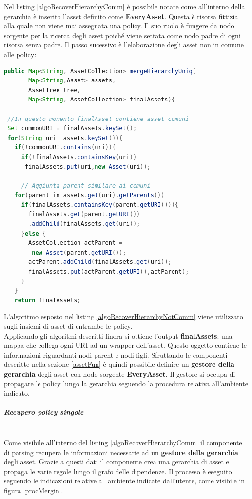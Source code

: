 \documentclass[12pt,a4paper,twoside]{book}
\begin{document}
Nel listing \ref{algoRecoverHierarchyComm} è possibile notare come all'interno della gerarchia è inserito l'asset definito come \textbf{EveryAsset}. Questa è risorsa fittizia alla quale non viene mai assegnata una policy. Il suo ruolo è fungere da nodo sorgente per la ricerca degli asset poiché viene settata come nodo padre di ogni risorsa senza padre.\newpage
Il passo sucessivo è l'elaborazione degli asset non in comune alle policy:\\
\begin{lstlisting}[language=java,firstnumber=1,caption={L'algoritmo ha prestazioni lineari in proporzione al numero di asset},label=algoRecoverHierarchyNotComm,captionpos=b]
public Map<String, AssetCollection> mergeHierarchyUniq(
       Map<String,Asset> assets,
       AssetTree tree,
       Map<String, AssetCollection> finalAssets){
       
 //In questo momento finalAsset contiene asset comuni      
 Set commonURI = finalAssets.keySet();  
 for(String uri: assets.keySet()){
   if(!commonURI.contains(uri)){
     if(!finalAssets.containsKey(uri))
      finalAssets.put(uri,new Asset(uri));
      
	 // Aggiunta parent similare ai comuni
   for(parent in assets.get(uri).getParents())
     if(finalAssets.containsKey(parent.getURI())){
       finalAssets.get(parent.getURI())
       .addChild(finalAssets.get(uri));
     }else {
       AssetCollection actParent =
        new Asset(parent.getURI());
       actParent.addChild(finalAssets.get(uri));
       finalAssets.put(actParent.getURI(),actParent);
     }
   }
   return finalAssets;
\end{lstlisting}
L'algoritmo esposto nel listing \ref{algoRecoverHierarchyNotComm} viene utilizzato sugli insiemi di asset di entrambe le policy.\\
Applicando gli algoritmi descritti finora si ottiene l'output \textbf{finalAssets}: una mappa che collega ogni URI ad un wrapper dell'asset. Questo oggetto contiene le informazioni riguardanti nodi parent e nodi figli. Sfruttando le componenti descritte nella sezione \ref{assetFun} è quindi possibile definire un \textbf{gestore della gerarchia} degli asset con nodo sorgente \textbf{EveryAsset}. Il gestore si occupa di propagare le policy lungo la gerarchia seguendo la procedura relativa all'ambiente indicato.
\subparagraph{Recupero policy singole}\mbox{}\\
Come visibile all'interno del listing \ref{algoRecoverHierarchyComm} il componente di parsing recupera le informazioni necessarie ad un \textbf{gestore della gerarchia} degli asset. Grazie a questi dati il componente crea una gerarchia di asset e propaga le varie regole lungo il grafo delle dipendenze. Il processo è eseguito seguendo le indicazioni relative all'ambiente indicate dall'utente, come visibile in figura \ref{procMergin}.\\
\end{document}
